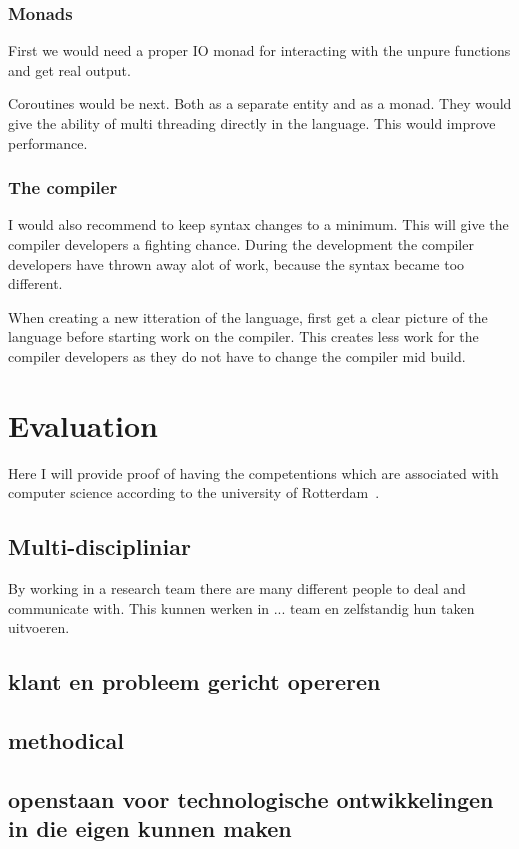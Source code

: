 \subsection{Monads}
First we would need a proper IO monad for interacting with the unpure functions and get real output.

Coroutines would be next.
Both as a separate entity and as a monad.
They would give the ability of multi threading directly in the language.
This would improve performance.

\subsection{The compiler}
I would also recommend to keep syntax changes to a minimum.
This will give the compiler developers a fighting chance.
During the development the compiler developers have thrown away alot of work, because the syntax became too different.

When creating a new itteration of the language, first get a clear picture of the language before starting work on the compiler.
This creates less work for the compiler developers as they do not have to change the compiler mid build.



\chapter{Evaluation}
Here I will provide proof of having the competentions which are associated with computer science according to the university of Rotterdam~\cite{}.

\section{Multi-discipliniar}
By working in a research team there are many different people to deal and communicate with.
This
kunnen werken in ... team en zelfstandig hun taken uitvoeren.
\section{klant en probleem gericht opereren}
\section{methodical}
\section{openstaan voor technologische ontwikkelingen in die eigen kunnen maken}
